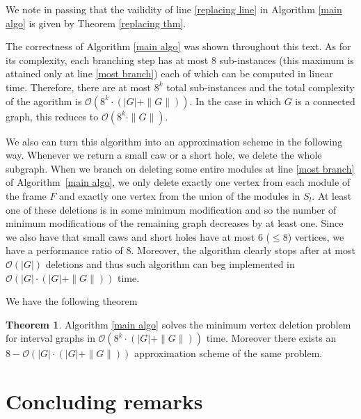 \documentclass{article}
\theoremstyle{definition}
\newtheorem{thm}{Theorem}[section]
\begin{document}
    We note in passing that the vailidity of
    line \ref{replacing line} in
    Algorithm \ref{main algo}
    is given by Theorem \ref{replacing thm}.
    
    The correctness of Algorithm \ref{main algo}
    was shown throughout this text.
    As for its complexity, each
    branching step has at most
    $8$ sub-instances (this
    maximum is attained only
    at line \ref{most branch}) each
    of which can be computed
    in linear time. Therefore,
    there are at most $8^{k}$ 
    total sub-instances and 
    the total complexity of the agorithm
    is $\mathcal{O} \left(8^{k} \cdot \left(\left|G\right| + \|G\|\right)\right)$.
    In the case in which $G$ is 
    a connected graph, this reduces to
    $\mathcal{O} \left(8^{k} \cdot \|G\|\right)$.

    We also can turn this
    algorithm into an approximation
    scheme in the following way. 
    Whenever we return a small caw
    or a short hole, we delete the whole
    subgraph. When we branch on deleting
    some entire modules at line \ref{most branch}
    of Algorithm~\ref{main algo},
    we only delete exactly one
    vertex from each module of
    the frame $F$ and exactly
    one vertex from the
    union of the modules in $S_{l}$.
    At least one of these
    deletions is in some
    minimum modification and
    so the number of minimum
    modifications of the
    remaining graph decreases
    by at least one.
    Since we also have
    that small caws and short
    holes have at most $6$ ($ \leq 8$)
    vertices, we have
    a performance ratio of $8$.
    Moreover, the algorithm clearly stops
    after at most $\mathcal{O} \left(\left|G\right|\right)$ 
    deletions and thus
    such algorithm can beg
    implemented in $\mathcal{O} \left(\left|G\right| \cdot \left(\left|G\right| + \|G\|\right)\right)$
    time.

    We have the following theorem

    \begin{thm}
        Algorithm \ref{main algo} solves
        the minimum vertex deletion
        problem for interval graphs
        in $\mathcal{O} \left(8^{k} \cdot \left(\left|G\right| + \|G\|\right)\right)$ time.
        Moreover there exists
        an $8-\mathcal{O} \left(\left|G\right| \cdot \left(\left|G\right| + \|G\|\right)\right)$
        approximation scheme of the 
        same problem.
    \end{thm}

    \section{Concluding remarks}
    
\end{document}
